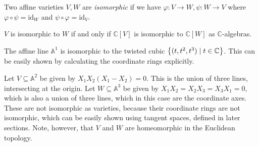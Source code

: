 \begin{definition}
    Two affine varieties \( V, W \) are \emph{isomorphic} if we have \( \varphi \colon V \to W, \psi \colon W \to V \) where \( \varphi \circ \psi = \mathrm{id}_W \) and \( \psi \circ \varphi = \mathrm{id}_V \).
\end{definition}
\begin{remark}
    \( V \) is isomorphic to \( W \) if and only if \( \mathbb C[V] \) is isomorphic to \( \mathbb C[W] \) as \( \mathbb C \)-algebras.
\end{remark}
\begin{example}
    The affine line \( \mathbb A^1 \) is isomorphic to the twisted cubic \( \qty{(t, t^2, t^3) \mid t \in \mathbb C} \).
    This can be easily shown by calculating the coordinate rings explicitly.
\end{example}
\begin{example}
    Let \( V \subseteq \mathbb A^2 \) be given by \( X_1 X_2 (X_1 - X_2) = 0 \).
    This is the union of three lines, intersecting at the origin.
    Let \( W \subseteq \mathbb A^3 \) be given by \( X_1 X_2 = X_2 X_3 = X_3 X_1 = 0 \), which is also a union of three lines, which in this case are the coordinate axes.
    These are not isomorphic as varieties, because their coordinate rings are not isomorphic, which can be easily shown using tangent spaces, defined in later sections.
    Note, however, that \( V \) and \( W \) are homeomorphic in the Euclidean topology.
\end{example}

